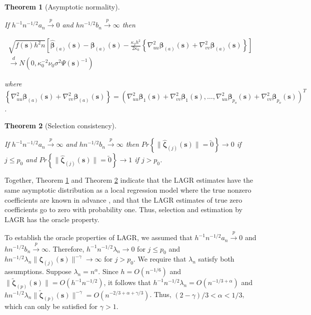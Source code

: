 \documentclass[authoryear,review, 12pt]{elsarticle}
\newtheorem{thm}{Theorem}
\begin{document}
\begin{thm}[Asymptotic normality]
\label{theorem:normality} 



If $h^{-1}n^{-1/2}a_{n}\xrightarrow{p}0$ and $hn^{-1/2}b_{n}\xrightarrow{p}\infty$
then

\begin{multline*}
\sqrt{f\left(\bm{s}\right)h^{2}n}\left[\hat{\bm{\beta}}_{\left(a\right)}\left(\bm{s}\right)-\bm{\beta}_{\left(a\right)}\left(\bm{s}\right)-\frac{\kappa_{2}h^{2}}{2\kappa_{0}}\left\{ \nabla_{uu}^{2}\bm{\beta}_{\left(a\right)}\left(\bm{s}\right)+\nabla_{vv}^{2}\bm{\beta}_{\left(a\right)}\left(\bm{s}\right)\right\} \right]\\
\xrightarrow{d}N\left(0,\kappa_{0}^{-2}\nu_{0}\sigma^{2}\Psi\left(\bm{s}\right)^{-1}\right)
\end{multline*}


where $\left\{ \nabla_{uu}^{2}\bm{\beta}_{\left(a\right)}\left(\bm{s}\right)+\nabla_{vv}^{2}\bm{\beta}_{\left(a\right)}\left(\bm{s}\right)\right\} =\left(\nabla_{uu}^{2}\bm{\beta}_{1}\left(\bm{s}\right)+\nabla_{vv}^{2}\bm{\beta}_{1}\left(\bm{s}\right),\dots,\nabla_{uu}^{2}\bm{\beta}_{p_{o}}\left(\bm{s}\right)+\nabla_{vv}^{2}\bm{\beta}_{p_{o}}\left(\bm{s}\right)\right)^{T}$.
\end{thm}

\begin{thm}[Selection consistency]
\label{theorem:selection}



If $h^{-1}n^{-1/2}a_{n}\xrightarrow{p}\infty$ and $hn^{-1/2}b_{n}\xrightarrow{p}\infty$
then $Pr\left\{ \|\hat{\bm{\zeta}}_{\left(j\right)}\left(\bm{s}\right)\|=\utilde{0}\right\} \to0$
if $j\le p_{0}$ and $Pr\left\{ \|\hat{\bm{\zeta}}_{\left(j\right)}\left(\bm{s}\right)\|=\utilde{0}\right\} \to1$
if $j>p_{0}$. 
\end{thm}
Together, Theorem \ref{theorem:normality} and Theorem \ref{theorem:selection}
indicate that the LAGR estimates have the same asymptotic distribution
as a local regression model where the true nonzero coefficients are
known in advance \citep{Sun-Yan-Zhang-Lu-2014}, and that the LAGR
estimates of true zero coefficients go to zero with probability one.
Thus, selection and estimation by LAGR has the oracle property.

To establish the oracle properties of LAGR, we assumed that $h^{-1}n^{-1/2}a_{n}\xrightarrow{p}0$
and $hn^{-1/2}b_{n}\xrightarrow{p}\infty$. Therefore, $h^{-1}n^{-1/2}\lambda_{n}\to0$
for $j\le p_{0}$ and $hn^{-1/2}\lambda_{n}\|\bm{\zeta}_{\left(j\right)}\left(\bm{s}\right)\|^{-\gamma}\to\infty$
for $j>p_{0}$. We require that $\lambda_{n}$ satisfy both assumptions.
Suppose $\lambda_{n}=n^{\alpha}$. Since $h=O\left(n^{-1/6}\right)$
and $\|\tilde{\bm{\zeta}}_{\left(p\right)}(\bm{s})\|=O\left(h^{-1}n^{-1/2}\right)$,
it follows that $h^{-1}n^{-1/2}\lambda_{n}=O\left(n^{-1/3+\alpha}\right)$
and $hn^{-1/2}\lambda_{n}\|\tilde{\bm{\zeta}}_{\left(p\right)}\left(\bm{s}\right)\|^{-\gamma}=O\left(n^{-2/3+\alpha+\gamma/3}\right)$.
Thus, $\left(2-\gamma\right)/3<\alpha<1/3$, which can only be satisfied
for $\gamma>1$.
\end{document}
